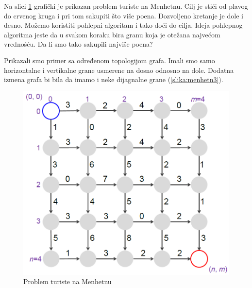 Na slici \ref{slika:menhetn} grafički je prikazan problem turiste na Menhetnu. Cilj je stići od plavog do crvenog kruga i pri tom sakupiti što više poena. Dozvoljeno kretanje je dole i desno. Možemo koristiti pohlepni algoritam i tako doći do cilja. Ideja pohlepnog algoritma jeste da u svakom koraku bira granu koja je otežana najvećom vrednošću. Da li smo tako sakupili najviše poena?

\noindent Prikazali smo primer sa određenom topologijom grafa. Imali smo samo horizontalne i vertikalne grane usmerene na dosno odnosno na dole. Dodatna izmena grafa bi bila da imamo i neke dijagnalne grane (\ref{slika:menhetn3}).

\begin{minipage}{\textwidth}
	\centering
	\begin{minipage}{0.45\textwidth}
		\begin{figure}[H]
			\centering
			\includegraphics[width=\textwidth]{poglavlja/5/slike/menhetn2.png}
			\caption{Problem turiste na Menhetnu}
			\label{slika:menhetn}
		\end{figure}  
	\end{minipage}
	\hfill 
	\begin{minipage}{0.45\textwidth}
		\begin{figure}[H]
			\centering

\end{figure}
\end{minipage}
\end{minipage}
